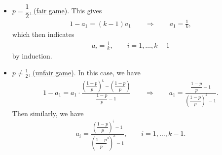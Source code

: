 \begin{itemize}
	\item \underline{$p = \dfrac{1}{2}$, (fair game)}. This gives
	\begin{align*}
	1 - a_1 = (k-1)a_1\qquad\Rightarrow\qquad a_1 = \frac{1}{k},
	\end{align*}
	which then indicates
	\begin{align*}
	a_i = \frac{i}{k}, \qquad i = 1, \ldots, k-1
	\end{align*}
	by induction.
	\item \underline{$p\neq \frac{1}{2}$, (unfair game)}. In this case, we have
	\begin{align*}
	1 - a_1 = a_1\cdot \frac{\left(\dfrac{1-p}{p} \right)^k - \left(\dfrac{1-p}{p} \right)}{\dfrac{1-p}{p} - 1} \qquad \Rightarrow \qquad a_1 = \frac{\dfrac{1-p}{p} - 1}{\left(\dfrac{1-p}{p} \right)^k - 1}.
	\end{align*}
	Then similarly, we have
	\begin{align*}
	a_i = \frac{\left(\dfrac{1-p}{p} \right)^i - 1}{\left(\dfrac{1-p}{p}^k \right)^k - 1}, \qquad i = 1, \ldots, k-1.
	\end{align*}
\end{itemize}




